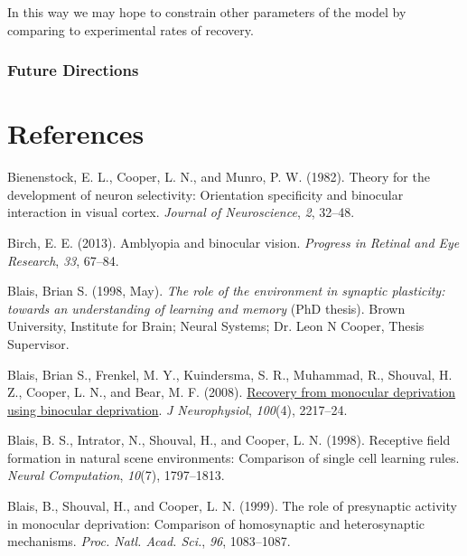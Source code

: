 \documentclass[
  onecolumn]{article}
\newlength{\cslhangindent}
\newenvironment{CSLReferences}[2] %
 {%
  \setlength{\parindent}{0pt}
  \ifodd #1 \everypar{\setlength{\hangindent}{\cslhangindent}}\ignorespaces\fi
  \ifnum #2 > 0
  \setlength{\parskip}{#2\baselineskip}
  \fi
 }%
 {}
\begin{document}
In this way we may hope to constrain other parameters of the model by
comparing to experimental rates of recovery.

\hypertarget{future-directions}{%
\subsubsection{Future Directions}\label{future-directions}}

\hypertarget{references}{%
\section*{References}\label{references}}

\hypertarget{refs}{}
\begin{CSLReferences}{1}{0}
\leavevmode{}%
Bienenstock, E. L., Cooper, L. N., and Munro, P. W. (1982). Theory for
the development of neuron selectivity: Orientation specificity and
binocular interaction in visual cortex. \emph{Journal of Neuroscience},
\emph{2}, 32--48.

\leavevmode{}%
Birch, E. E. (2013). Amblyopia and binocular vision. \emph{Progress in
Retinal and Eye Research}, \emph{33}, 67--84.

\leavevmode{}%
Blais, Brian S. (1998, May). \emph{The role of the environment in
synaptic plasticity:\\
towards an understanding of learning and memory} (PhD thesis). Brown
University, Institute for Brain; Neural Systems; Dr. Leon N Cooper,
Thesis Supervisor.

\leavevmode{}%
Blais, Brian S., Frenkel, M. Y., Kuindersma, S. R., Muhammad, R.,
Shouval, H. Z., Cooper, L. N., and Bear, M. F. (2008).
\href{https://doi.org/10.1152/jn.90411.2008}{Recovery from monocular
deprivation using binocular deprivation}. \emph{J Neurophysiol},
\emph{100}(4), 2217--24.

\leavevmode{}%
Blais, B. S., Intrator, N., Shouval, H., and Cooper, L. N. (1998).
Receptive field formation in natural scene environments: Comparison of
single cell learning rules. \emph{Neural Computation}, \emph{10}(7),
1797--1813.

\leavevmode{}%
Blais, B., Shouval, H., and Cooper, L. N. (1999). The role of
presynaptic activity in monocular deprivation: Comparison of
homosynaptic and heterosynaptic mechanisms. \emph{Proc. Natl. Acad.
Sci.}, \emph{96}, 1083--1087.


\end{CSLReferences}
\end{document}
